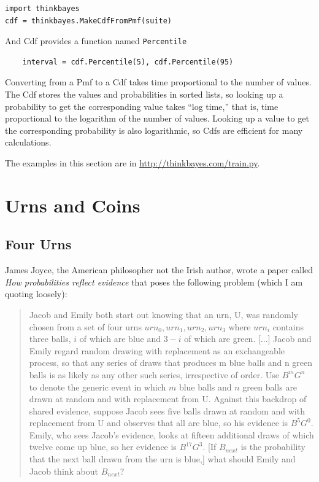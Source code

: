 \documentclass[12pt]{book}
\begin{document}
\begin{verbatim}
import thinkbayes
cdf = thinkbayes.MakeCdfFromPmf(suite)
\end{verbatim}

And Cdf provides a function named \verb"Percentile"

\begin{verbatim}
    interval = cdf.Percentile(5), cdf.Percentile(95)
\end{verbatim}

Converting from a Pmf to a Cdf takes time proportional to the number
of values.  The Cdf stores the values and probabilities in sorted
lists, so looking up a probability to get the corresponding value
takes ``log time,'' that is, time proportional to the logarithm of the
number of values.  Looking up a value to get the corresponding
probability is also logarithmic, so Cdfs are efficient for many
calculations.

The examples in this section are in \url{http://thinkbayes.com/train.py}.


\chapter{Urns and Coins}

\section{Four Urns}

James Joyce, the American philosopher not the Irish author, wrote
a paper called {\it How probabilities reflect evidence} that poses
the following problem (which I am quoting loosely):

\begin{quote}
Jacob and Emily both start out knowing that an urn, U, was
randomly chosen from a set of four urns ${urn_0, urn_1, urn_2, urn_3}$
where $urn_i$ contains three balls, $i$ of which are blue and $3-i$ of
which are green. [...]  Jacob and Emily regard random drawing with
replacement as an exchangeable process, so that any series of draws
that produces m blue balls and n green balls is as likely as any other
such series, irrespective of order.  Use $B^m G^n$ to denote the generic
event in which $m$ blue balls and $n$ green balls are drawn at random
and with replacement from U.  Against this backdrop of shared
evidence, suppose Jacob sees five balls drawn at random and with
replacement from U and observes that all are blue, so his evidence is
$B^5 G^0$.  Emily, who sees Jacob's evidence, looks at fifteen additional
draws of which twelve come up blue, so her evidence is $B^{17} G^3$.  [If
$B_{next}$ is the probability that the next ball drawn from the urn is
blue,] what should Emily and Jacob think about $B_{next}$?
\end{quote}
\end{document}
